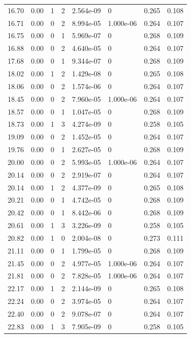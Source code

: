 \documentclass[preview]{standalone}
\begin{document}
{{{\begin{tabular}{L{1.2cm}C{1.2cm} C{0.3cm}C{0.5cm} C{1.4cm}C{1.4cm} C{1.4cm}C{1.4cm}}
  16.70  &  0.00  & 1     &  2 &  2.564e-09  & 0  & 0.265 &  0.108   \\ 
  16.71  &  0.00  & 0     &  2 &  8.994e-05  & 1.000e-06  & 0.264 &  0.107   \\ 
  16.75  &  0.00  & 0     &  1 &  5.969e-07  & 0  & 0.268 &  0.109   \\ 
  16.88  &  0.00  & 0     &  2 &  4.640e-05  & 0  & 0.264 &  0.107   \\ 
  17.68  &  0.00  & 0     &  1 &  9.344e-07  & 0  & 0.268 &  0.109   \\ 
  18.02  &  0.00  & 1     &  2 &  1.429e-08  & 0  & 0.265 &  0.108   \\ 
  18.06  &  0.00  & 0     &  2 &  1.574e-06  & 0  & 0.264 &  0.107   \\ 
  18.45  &  0.00  & 0     &  2 &  7.960e-05  & 1.000e-06  & 0.264 &  0.107   \\ 
  18.57  &  0.00  & 0     &  1 &  1.047e-05  & 0  & 0.268 &  0.109   \\ 
  18.73  &  0.00  & 1     &  3 &  4.274e-09  & 0  & 0.258 &  0.105   \\ 
  19.09  &  0.00  & 0     &  2 &  1.452e-05  & 0  & 0.264 &  0.107   \\ 
  19.76  &  0.00  & 0     &  1 &  2.627e-05  & 0  & 0.268 &  0.109   \\ 
  20.00  &  0.00  & 0     &  2 &  5.993e-05  & 1.000e-06  & 0.264 &  0.107   \\ 
  20.14  &  0.00  & 0     &  2 &  2.919e-07  & 0  & 0.264 &  0.107   \\ 
  20.14  &  0.00  & 1     &  2 &  4.377e-09  & 0  & 0.265 &  0.108   \\ 
  20.21  &  0.00  & 0     &  1 &  4.742e-05  & 0  & 0.268 &  0.109   \\ 
  20.42  &  0.00  & 0     &  1 &  8.442e-06  & 0  & 0.268 &  0.109   \\ 
  20.61  &  0.00  & 1     &  3 &  3.226e-09  & 0  & 0.258 &  0.105   \\ 
  20.82  &  0.00  & 1     &  0 &  2.004e-08  & 0  & 0.273 &  0.111   \\ 
  21.11  &  0.00  & 0     &  1 &  1.799e-05  & 0  & 0.268 &  0.109   \\ 
  21.45  &  0.00  & 0     &  2 &  4.977e-05  & 1.000e-06  & 0.264 &  0.107   \\ 
  21.81  &  0.00  & 0     &  2 &  7.828e-05  & 1.000e-06  & 0.264 &  0.107   \\ 
  22.17  &  0.00  & 1     &  2 &  2.144e-09  & 0  & 0.265 &  0.108   \\ 
  22.24  &  0.00  & 0     &  2 &  3.974e-05  & 0  & 0.264 &  0.107   \\ 
  22.40  &  0.00  & 0     &  2 &  9.078e-07  & 0  & 0.264 &  0.107   \\ 
  22.83  &  0.00  & 1     &  3 &  7.905e-09  & 0  & 0.258 &  0.105   \\ 
\hline 
\end{tabular} 

}}}
\end{document}
